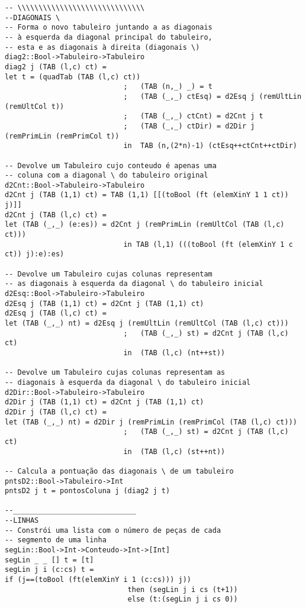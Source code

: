 \documentclass[a4paper,titlepage]{scrreprt}
\begin{document}
\begin{verbatim}
-- \\\\\\\\\\\\\\\\\\\\\\\\\\\\\\
--DIAGONAIS \
-- Forma o novo tabuleiro juntando a as diagonais
-- à esquerda da diagonal principal do tabuleiro,
-- esta e as diagonais à direita (diagonais \)
diag2::Bool->Tabuleiro->Tabuleiro
diag2 j (TAB (l,c) ct) = 	
let	t = (quadTab (TAB (l,c) ct))
							;	(TAB (n,_) _) = t
							;	(TAB (_,_) ctEsq) = d2Esq j (remUltLin (remUltCol t))
							;	(TAB (_,_) ctCnt) = d2Cnt j t
							;	(TAB (_,_) ctDir) = d2Dir j (remPrimLin (remPrimCol t))
							in	TAB (n,(2*n)-1) (ctEsq++ctCnt++ctDir)

-- Devolve um Tabuleiro cujo conteudo é apenas uma
-- coluna com a diagonal \ do tabuleiro original
d2Cnt::Bool->Tabuleiro->Tabuleiro
d2Cnt j (TAB (1,1) ct) = TAB (1,1) [[(toBool (ft (elemXinY 1 1 ct)) j)]]
d2Cnt j (TAB (l,c) ct) =	
let	(TAB (_,_) (e:es)) = d2Cnt j (remPrimLin (remUltCol (TAB (l,c) ct)))
							in TAB (l,1) (((toBool (ft (elemXinY 1 c ct)) j):e):es)

-- Devolve um Tabuleiro cujas colunas representam
-- as diagonais à esquerda da diagonal \ do tabuleiro inicial
d2Esq::Bool->Tabuleiro->Tabuleiro
d2Esq j (TAB (1,1) ct) = d2Cnt j (TAB (1,1) ct)
d2Esq j (TAB (l,c) ct) = 	
let	(TAB (_,_) nt) = d2Esq j (remUltLin (remUltCol (TAB (l,c) ct)))
							;	(TAB (_,_) st) = d2Cnt j (TAB (l,c) ct)
							in	(TAB (l,c) (nt++st))

-- Devolve um Tabuleiro cujas colunas representam as
-- diagonais à esquerda da diagonal \ do tabuleiro inicial
d2Dir::Bool->Tabuleiro->Tabuleiro
d2Dir j (TAB (1,1) ct) = d2Cnt j (TAB (1,1) ct)
d2Dir j (TAB (l,c) ct) =	
let (TAB (_,_) nt) = d2Dir j (remPrimLin (remPrimCol (TAB (l,c) ct)))
							;	(TAB (_,_) st) = d2Cnt j (TAB (l,c) ct)
							in	(TAB (l,c) (st++nt))

-- Calcula a pontuação das diagonais \ de um tabuleiro
pntsD2::Bool->Tabuleiro->Int
pntsD2 j t = pontosColuna j (diag2 j t)

--_____________________________
--LINHAS
-- Constrói uma lista com o número de peças de cada
-- segmento de uma linha
segLin::Bool->Int->Conteudo->Int->[Int]
segLin _ _ [] t = [t]
segLin j i (c:cs) t = 
if (j==(toBool (ft(elemXinY i 1 (c:cs))) j))
							 then (segLin j i cs (t+1))
							 else (t:(segLin j i cs 0))


\end{verbatim}
\end{document}
